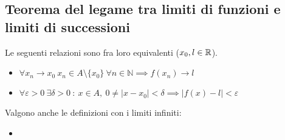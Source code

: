 \documentclass[../../main.tex]{subfiles}
\begin{document}
\subsection{Teorema del legame tra limiti di funzioni e limiti di successioni}
Le seguenti relazioni sono fra loro equivalenti ($x_0, l\in\mathbb{R}$).
\begin{itemize}
    \item $\forall x_n \to x_0 \ x_n \in A \setminus \{x_0\} \ \forall n\in \mathbb{N} \implies f(x_n) \to l$
    \item $\forall\varepsilon>0 \ \exists\delta>0 \ : \ x\in A, \ 0\neq |x-x_0|<\delta \implies |f(x)-l|<\varepsilon$
\end{itemize}
Valgono anche le definizioni con i limiti infiniti:
\begin{itemize}
    \item
\end{itemize}
\end{document}

